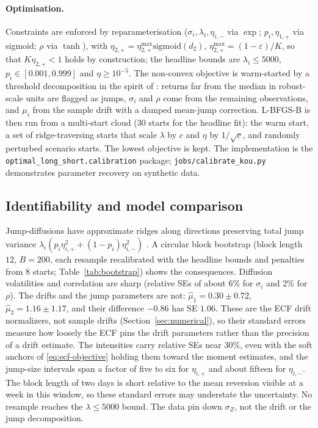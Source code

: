 \documentclass[11pt]{article}
\theoremstyle{plain}
\theoremstyle{definition}
\theoremstyle{remark}
\begin{document}
\paragraph{Optimisation.} Constraints are enforced by reparameterisation ($\sigma_i,\lambda_i,\eta_{i,-}$
via $\exp$; $p_i,\eta_{1,+}$ via sigmoid; $\rho$ via $\tanh$), with
$\eta_{2,+}=\eta_{2,+}^{\max}\mathrm{sigmoid}(d_2)$, $\eta_{2,+}^{\max}=(1-\varepsilon)/K$, so that
$K\eta_{2,+}<1$ holds by construction; the headline bounds are $\lambda_i\le5000$,
$p_i\in[0.001,0.999]$ and $\eta\ge10^{-5}$. The non-convex objective is warm-started by a threshold
decomposition in the spirit of \citet{Mancini2009}: returns far from the median in robust-scale units
are flagged as jumps, $\sigma_i$ and $\rho$ come from the remaining observations, and $\mu_i$ from the
sample drift with a damped mean-jump correction. L-BFGS-B is then run from a multi-start cloud ($30$
starts for the headline fit): the warm start, a set of ridge-traversing starts that scale $\lambda$ by
$c$ and $\eta$ by $1/\sqrt c$, and randomly perturbed scenario starts. The lowest objective is kept.
The implementation is the \texttt{optimal\_long\_short.calibration} package;
\texttt{jobs/calibrate\_kou.py} demonstrates parameter recovery on synthetic data.

\subsection{Identifiability and model comparison}\label{sec:ecf-ident}

Jump-diffusions have approximate ridges along directions preserving total jump variance
$\lambda_i(p_i\eta_{i,+}^2+(1-p_i)\eta_{i,-}^2)$ \citep{RamezaniZeng2007}. A circular block
bootstrap (block length $12$, $B=200$, each resample recalibrated with the headline bounds and
penalties from $8$ starts; Table~\ref{tab:bootstrap}) shows the consequences. Diffusion volatilities
and correlation are sharp (relative SEs of about $6\%$ for $\sigma_i$ and $2\%$ for $\rho$). The drifts and the jump parameters are not:
$\hat\mu_1=0.30\pm0.72$, $\hat\mu_2=1.16\pm1.17$, and their difference $-0.86$ has SE $1.06$.
These are the ECF drift normalizers, not sample drifts (Section~\ref{sec:numerical}), so their
standard errors measure how loosely the ECF pins the drift parameters rather than the precision of a
drift estimate. The intensities carry relative SEs near $30\%$, even with the soft
anchors of \eqref{eq:ecf-objective} holding them toward the moment estimates, and the jump-size
intervals span a factor of five to six for $\eta_{i,+}$ and about fifteen for $\eta_{i,-}$. The block
length of two days is short relative to the mean reversion visible at a week in this window, so these
standard errors may understate the uncertainty. No resample reaches the $\lambda\le5000$ bound. The data
pin down $\sigma_Z$, not the drift or the jump decomposition.
\end{document}
